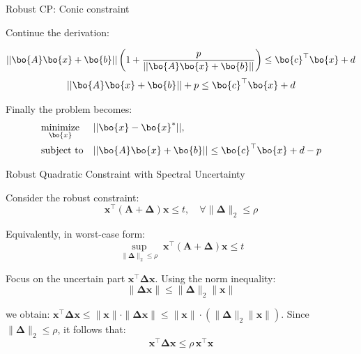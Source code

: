 \documentclass{beamer}
\begin{document}
\begin{frame}{Robust CP: Conic constraint}
	\begin{flushleft}
		
		Continue the derivation:
		
		\begin{equation}
			|| \bo{A}\bo{x} + \bo{b}|| \left( 1 + \frac{p}{|| \bo{A}\bo{x} + \bo{b}||} \right) \leq \bo{c}^\top \bo{x} + d
		\end{equation}
		\begin{equation}
			|| \bo{A}\bo{x} + \bo{b}|| + p \leq \bo{c}^\top \bo{x} + d
		\end{equation}
		
		Finally the problem becomes:
		\begin{equation}
			\begin{aligned}
				& \underset{\bo{x}}{\text{minimize}}
				& & ||\bo{x} - \bo{x}^*||, \\
				& \text{subject to}
				& & || \bo{A}\bo{x} + \bo{b}|| \leq \bo{c}^\top \bo{x} + d - p
			\end{aligned}
		\end{equation}
		
	\end{flushleft}
\end{frame}

\begin{frame}{Robust Quadratic Constraint with Spectral Uncertainty}
	\begin{flushleft}
		
		Consider the robust constraint:
		\[
		\mathbf{x}^\top (\mathbf{A} + \mathbf{\Delta}) \mathbf{x} \le t, \quad \forall \|\mathbf{\Delta}\|_2 \le \rho
		\]
		
		
		Equivalently, in worst-case form:
		\[
		\sup_{\|\mathbf{\Delta}\|_2 \le \rho} \; \mathbf{x}^\top (\mathbf{A} + \mathbf{\Delta})\mathbf{x} \le t
		\]
		
		Focus on the uncertain part $\mathbf{x}^\top \mathbf{\Delta} \mathbf{x}$. Using the norm inequality:
		\[
		\|\mathbf{\Delta} \mathbf{x}\| \le \|\mathbf{\Delta}\|_2 \|\mathbf{x}\|
		\]
		
		we obtain: $\mathbf{x}^\top \mathbf{\Delta} \mathbf{x} \le \|\mathbf{x}\| \cdot \|\mathbf{\Delta} \mathbf{x}\|
		\le \|\mathbf{x}\| \cdot (\|\mathbf{\Delta}\|_2 \|\mathbf{x}\|)$. 
		Since \( \|\mathbf{\Delta}\|_2 \le \rho \), it follows that:
		\[
		\mathbf{x}^\top \mathbf{\Delta} \mathbf{x} \le \rho \, \mathbf{x}^\top \mathbf{x}
		\]
		
	\end{flushleft}
\end{frame}
\end{document}
